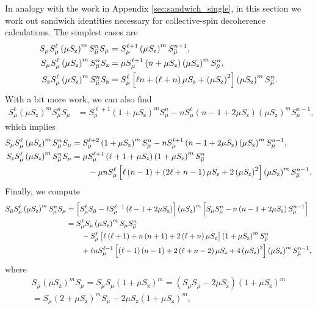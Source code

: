 \documentclass[aps,11pt,notitlepage,nofootinbib,longbibliography]{revtex4-1}
\newcommand{\p}[1]{\left(#1\right)} %
\renewcommand{\sp}[1]{\left[#1\right]} %
\newcommand{\z}{\text{z}}
\newcommand{\bmu}{{\bar\mu}}
\newcommand{\1}{\mathds{1}}
\begin{document}
In analogy with the work in Appendix \ref{sec:sandwich_single}, in
this section we work out sandwich identities necessary for
collective-spin decoherence calculations.  The simplest cases are
\begin{align}
  S_\mu S_\mu^\ell \p{\mu S_\z}^m S_\bmu^n S_\bmu
  &= S_\mu^{\ell+1} \p{\mu S_\z}^m S_\bmu^{n+1},
  \allowdisplaybreaks \\
  S_\mu S_\mu^\ell \p{\mu S_\z}^m S_\bmu^n S_\z
  &= \mu S_\mu^{\ell+1} \p{n+\mu S_\z} \p{\mu S_\z}^m S_\bmu^n,
  \allowdisplaybreaks \\
  S_\z S_\mu^\ell \p{\mu S_\z}^m S_\bmu^n S_\z
  &= S_\mu^\ell \sp{\ell n + \p{\ell+n} \mu S_\z + \p{\mu S_\z}^2}
  \p{\mu S_\z}^m S_\bmu^n.
\end{align}
With a bit more work, we can also find
\begin{align}
  S_\mu^\ell \p{\mu S_\z}^m S_\bmu^n S_\mu
  &= S_\mu^{\ell+1} \p{1+\mu S_\z}^m S_\bmu^n
  - n S_\mu^\ell \p{n-1+2\mu S_\z} \p{\mu S_\z}^m S_\bmu^{n-1},
\end{align}
which implies
\begin{align}
  S_\mu S_\mu^\ell \p{\mu S_\z}^m S_\bmu^n S_\mu
  &= S_\mu^{\ell+2} \p{1+\mu S_\z}^m S_\bmu^n
  - n S_\mu^{\ell+1} \p{n-1+2\mu S_\z} \p{\mu S_\z}^m S_\bmu^{n-1},
  \allowdisplaybreaks \\
  S_\z S_\mu^\ell \p{\mu S_\z}^m S_\bmu^n S_\mu
  &= \mu S_\mu^{\ell+1} \p{\ell+1+\mu S_\z} \p{1+\mu S_\z}^m S_\bmu^n
  \notag \\
  &\qquad - \mu n S_\mu^\ell
  \sp{\ell\p{n-1} + \p{2\ell+n-1}\mu S_\z + 2\p{\mu S_\z}^2}
  \p{\mu S_\z}^m S_\bmu^{n-1}.
\end{align}
Finally, we compute
\begin{align}
  S_\bmu S_\mu^\ell \p{\mu S_\z}^m S_\bmu^n S_\mu
  &= \sp{S_\mu^\ell S_\bmu - \ell S_\mu^{\ell-1} \p{\ell-1+2\mu S_\z}}
  \p{\mu S_\z}^m
  \sp{S_\mu S_\bmu^n - n \p{n-1+2\mu S_\z} S_\bmu^{n-1}} \notag \\
  &= S_\mu^\ell S_\bmu \p{\mu S_\z}^m S_\mu S_\bmu^n \notag \\
  &\qquad - S_\mu^\ell
  \sp{\ell\p{\ell+1} + n\p{n+1}+2\p{\ell+n}\mu S_\z}
  \p{1+\mu S_\z}^m S_\bmu^n \notag \\
  &\qquad + \ell n S_\mu^{\ell-1}
  \sp{\p{\ell-1}\p{n-1}+2\p{\ell+n-2}\mu S_\z + 4\p{\mu S_\z}^2}
  \p{\mu S_\z}^m S_\bmu^{n-1},
\end{align}
where
\begin{multline}
  S_\bmu \p{\mu S_\z}^m S_\mu
  = S_\bmu S_\mu \p{1+\mu S_\z}^m
  = \p{S_\mu S_\bmu - 2\mu S_\z} \p{1+\mu S_\z}^m \\
  = S_\mu \p{2+\mu S_\z}^m S_\bmu - 2\mu S_\z \p{1+\mu S_\z}^m,
\end{multline}
\end{document}
